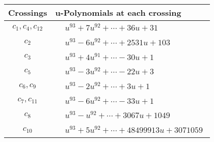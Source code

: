\documentclass[1p]{elsarticle_modified}
\theoremstyle{definition}
\begin{document}
\begin{tabular}{m{50pt}|m{274pt}}
Crossings & \hspace{64pt}u-Polynomials at each crossing \\
\hline $$\begin{aligned}c_{1},c_{4},c_{12}\end{aligned}$$&$\begin{aligned}
&u^{93}+7 u^{92}+\cdots+36 u+31
\end{aligned}$\\
\hline $$\begin{aligned}c_{2}\end{aligned}$$&$\begin{aligned}
&u^{93}-6 u^{92}+\cdots+2531 u+103
\end{aligned}$\\
\hline $$\begin{aligned}c_{3}\end{aligned}$$&$\begin{aligned}
&u^{93}+4 u^{91}+\cdots-30 u+1
\end{aligned}$\\
\hline $$\begin{aligned}c_{5}\end{aligned}$$&$\begin{aligned}
&u^{93}-3 u^{92}+\cdots-22 u+3
\end{aligned}$\\
\hline $$\begin{aligned}c_{6},c_{9}\end{aligned}$$&$\begin{aligned}
&u^{93}-2 u^{92}+\cdots+3 u+1
\end{aligned}$\\
\hline $$\begin{aligned}c_{7},c_{11}\end{aligned}$$&$\begin{aligned}
&u^{93}-6 u^{92}+\cdots-33 u+1
\end{aligned}$\\
\hline $$\begin{aligned}c_{8}\end{aligned}$$&$\begin{aligned}
&u^{93}- u^{92}+\cdots+3067 u+1049
\end{aligned}$\\
\hline $$\begin{aligned}c_{10}\end{aligned}$$&$\begin{aligned}
&u^{93}+5 u^{92}+\cdots+48499913 u+3071059
\end{aligned}$\\
\hline
\end{tabular}\\~\\
\end{document}
